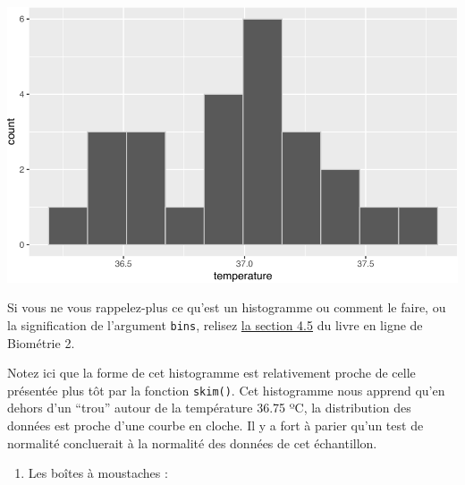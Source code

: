 \documentclass[
  a4paper,
]{article}
\newenvironment{Shaded}{\begin{snugshade}}{\end{snugshade}}
\newcommand{\DataTypeTok}[1]{\textcolor[rgb]{0.00,0.34,0.68}{#1}}
\newcommand{\DecValTok}[1]{\textcolor[rgb]{0.69,0.50,0.00}{#1}}
\newcommand{\FloatTok}[1]{\textcolor[rgb]{0.69,0.50,0.00}{#1}}
\newcommand{\KeywordTok}[1]{\textcolor[rgb]{0.12,0.11,0.11}{\textbf{#1}}}
\newcommand{\NormalTok}[1]{\textcolor[rgb]{0.12,0.11,0.11}{#1}}
\newcommand{\OperatorTok}[1]{\textcolor[rgb]{0.12,0.11,0.11}{#1}}
\newcommand{\OtherTok}[1]{\textcolor[rgb]{0.00,0.43,0.16}{#1}}
\newcommand{\StringTok}[1]{\textcolor[rgb]{0.75,0.01,0.01}{#1}}
\providecommand{\tightlist}{%
  \setlength{\itemsep}{0pt}\setlength{\parskip}{0pt}}
\begin{document}
\begin{Shaded}
\end{Shaded}

\begin{center}\includegraphics[width=0.9\linewidth]{figure/unnamed-chunk-18-1} \end{center}

Si vous ne vous rappelez-plus ce qu'est un histogramme ou comment le faire, ou la signification de l'argument \texttt{bins}, relisez \href{https://besibo.github.io/DA/viz.html\#histogram}{la section 4.5} du livre en ligne de Biométrie 2.

Notez ici que la forme de cet histogramme est relativement proche de celle présentée plus tôt par la fonction \texttt{skim()}. Cet histogramme nous apprend qu'en dehors d'un ``trou'' autour de la température 36.75 ºC, la distribution des données est proche d'une courbe en cloche. Il y a fort à parier qu'un test de normalité concluerait à la normalité des données de cet échantillon.

\begin{enumerate}
\def\labelenumi{\arabic{enumi}.}
\setcounter{enumi}{2}
\tightlist
\item
  Les boîtes à moustaches :
\end{enumerate}

\begin{Shaded}
\end{Shaded}
\end{document}
